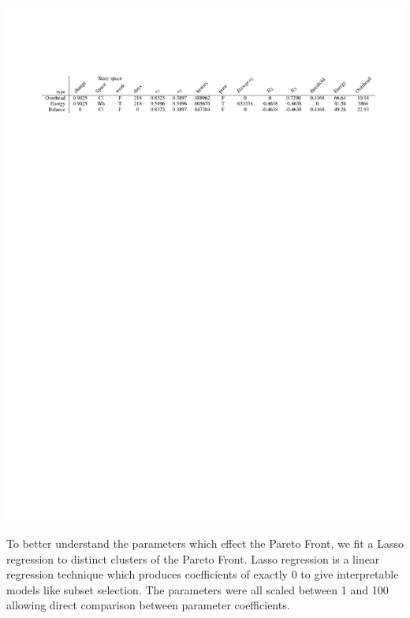 \documentclass[10pt, conference, compsocconf]{IEEEtran}
\begin{document}
\begin{table}[tb]
\caption{Parameters for optimal objectives}
\label{tab:optimal}
\includegraphics{figures/results/table}
\end{table}
To better understand the parameters which effect the Pareto Front, we fit a Lasso regression \cite{Tibshirani1996} to distinct clusters of the Pareto Front. Lasso regression is a linear regression technique which produces coefficients of exactly 0 to give interpretable models like subset selection. The parameters were all scaled between 1 and 100 allowing direct comparison between parameter coefficients.
\end{document}
